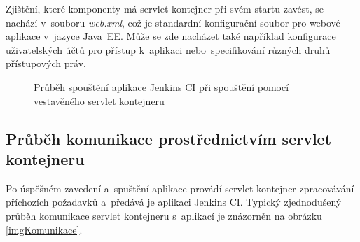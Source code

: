             Zjištění, které komponenty má servlet kontejner při svém startu zavést,
            se nachází v~souboru \emph{web.xml}, což je standardní konfigurační soubor
            pro webové aplikace v~jazyce Java~EE. Může se zde nacházet také například
            konfigurace uživatelských účtů pro přístup k~aplikaci nebo~specifikování
            různých druhů přístupových práv.


            \begin{figure}[h!t]
                \begin{center}
                    \caption{Průběh spouštění aplikace Jenkins CI při spouštění pomocí vestavěného servlet kontejneru}
                    \label{imgArchitekturaSpusteni}
                \end{center}
            \end{figure}


        \subsection{Průběh komunikace prostřednictvím servlet kontejneru}
            Po úspěšném zavedení a~spuštění aplikace provádí servlet kontejner
            zpracovávání příchozích požadavků a~předává je aplikaci Jenkins CI. 
            Typický zjednodušený průběh komunikace servlet kontejneru s~aplikací je znázorněn
            na obrázku \ref{imgKomunikace}. 

